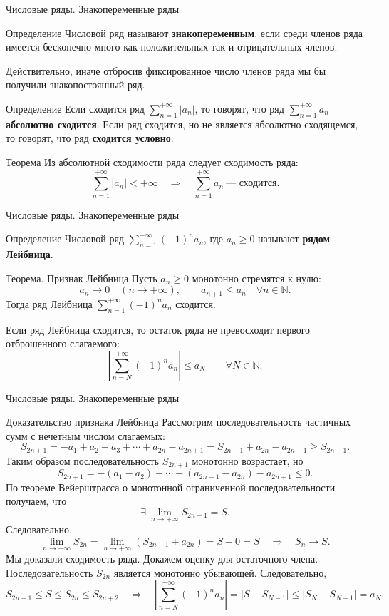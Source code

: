 \documentclass[8pt]{beamer}
\begin{document}
\begin{frame}{Числовые ряды. Знакопеременные ряды}
\begin{block}{Определение}
Числовой ряд называют {\bf знакопеременным}, если среди членов ряда имеется бесконечно много как положительных так и отрицательных членов. 
\end{block}
Действительно, иначе отбросив фиксированное число членов ряда мы бы получили знакопостоянный ряд.
\begin{block}{Определение}
Если сходится ряд $\displaystyle \sum_{n=1}^{+\infty}|a_n|$, то говорят, что ряд $\displaystyle \sum_{n=1}^{+\infty}a_n$ {\bf абсолютно сходится}. Если ряд сходится, но не является абсолютно сходящемся, то говорят, что ряд {\bf сходится условно}.
\end{block}
\begin{block}{Теорема}
Из абсолютной сходимости ряда следует сходимость ряда:
$$\sum_{n=1}^{+\infty}|a_n|<+\infty \quad \Rightarrow \quad \sum_{n=1}^{+\infty}a_n \ \text{--- сходится.}
$$
\end{block}
\end{frame}

\begin{frame}{Числовые ряды. Знакопеременные ряды}
\begin{block}{Определение}
Числовой ряд $\displaystyle \sum_{n=1}^{+\infty}(-1)^n a_n$, где $a_n\ge 0$ называют {\bf рядом Лейбница}. 
\end{block}
\begin{block}{Теорема. Признак Лейбница}
Пусть $a_n\ge 0$ монотонно стремятся к нулю:
$$a_n\to 0\quad (n\to+\infty),\qquad  a_{n+1}\le a_n \quad \forall n\in\mathbb{N}.$$
Тогда ряд Лейбница $\displaystyle \sum_{n=1}^{+\infty}(-1)^n a_n$ сходится.

Если ряд Лейбница сходится, то остаток ряда не превосходит первого отброшенного слагаемого:
$$\left| \sum_{n=N}^{+\infty}(-1)^n a_n \right| \le a_N \qquad \forall N\in\mathbb{N}.$$
\end{block}
\end{frame}

\begin{frame}{Числовые ряды. Знакопеременные ряды}
\begin{block}{Доказательство признака Лейбница}
Рассмотрим последовательность частичных сумм с нечетным числом слагаемых:
$$S_{2n+1} = -a_1+a_2-a_3+\cdots+a_{2n}-a_{2n+1} = S_{2n-1}+a_{2n}-a_{2n+1}\ge S_{2n-1}.$$
Таким образом последовательность $S_{2n+1}$ монотонно возрастает, но
$$S_{2n+1} =-(a_1-a_2)-\cdots - (a_{2n-1}-a_{2n})-a_{2n+1} \le 0.$$
По теореме Вейерштрасса о монотонной ограниченной последовательности получаем, что
$$\exists\ \lim_{n\to+\infty}S_{2n+1} = S.$$
Следовательно,
$$\lim_{n\to+\infty}S_{2n} =\lim_{n\to+\infty}( S_{2n-1}+a_{2n}) = S+0 = S\quad \Rightarrow \quad S_{n}\to S.
$$
Мы доказали сходимость ряда. Докажем оценку для остаточного члена.
Последовательность $S_{2n}$ является монотонно убывающей. Следовательно,
$$S_{2n+1}\le S \le S_{2n}\le S_{2n+2} \quad \Rightarrow\quad
\left| \sum_{n=N}^{+\infty}(-1)^n a_n \right| = \left| S-S_{N-1} \right| \le \left| S_{N}-S_{N-1} \right|=a_N.$$
\end{block}
\end{frame}
\end{document}

